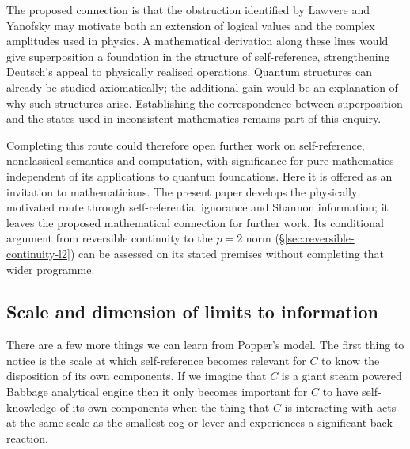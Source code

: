 The proposed connection is that the obstruction identified by Lawvere and Yanofsky may motivate
both an extension of logical values and the complex amplitudes used in physics. A mathematical
derivation along these lines would give superposition a foundation in the structure of
self-reference, strengthening Deutsch's appeal to physically realised operations. Quantum
structures can already be studied axiomatically; the additional gain would be an explanation of
why such structures arise. Establishing the correspondence between superposition and the states
used in inconsistent mathematics remains part of this enquiry.

Completing this route could therefore open further work on self-reference, nonclassical semantics
and computation, with significance for pure mathematics independent of its applications to
quantum foundations. Here it is offered as an invitation to mathematicians. The present paper
develops the physically motivated route through self-referential ignorance and Shannon
information; it leaves the proposed mathematical connection for further work. Its conditional
argument from reversible continuity to the $p=2$ norm
(\S\ref{sec:reversible-continuity-l2}) can be assessed on its stated premises without completing
that wider programme.


\subsection{Scale and dimension of limits to information }
There are a few more things we can learn from Popper's model. The first thing to notice is the
scale at which self-reference becomes relevant for $C$ to know the disposition of its own
components. If we imagine that $C$ is a giant steam powered Babbage analytical engine then it
only becomes important for $C$ to have self-knowledge of its own components when the thing that
$C$ is interacting with acts at the same scale as the smallest cog or lever and experiences a
significant back reaction.

